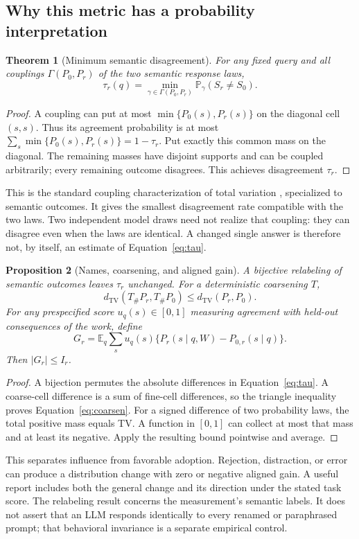 \documentclass[11pt,letterpaper]{article}
\newtheorem{theorem}{Theorem}
\newtheorem{proposition}[theorem]{Proposition}
\theoremstyle{definition}\newtheorem{definition}[theorem]{Definition}
\newcommand{\TV}{d_{\mathrm{TV}}}
\newcommand{\E}{\mathbb{E}}
\newcommand{\Prob}{\mathbb{P}}
\begin{document}
\subsection{Why this metric has a probability interpretation}
\begin{theorem}[Minimum semantic disagreement]
For any fixed query and all couplings $\Gamma(P_0,P_r)$ of the two semantic response laws,
\begin{equation}
\tau_r(q)=\min_{\gamma\in\Gamma(P_0,P_r)}\Prob_\gamma(S_r\ne S_0).
\label{eq:coupling}
\end{equation}
\end{theorem}
\begin{proof}
A coupling can put at most $\min\{P_0(s),P_r(s)\}$ on the diagonal cell $(s,s)$. Thus its agreement probability is at most $\sum_s\min\{P_0(s),P_r(s)\}=1-\tau_r$. Put exactly this common mass on the diagonal. The remaining masses have disjoint supports and can be coupled arbitrarily; every remaining outcome disagrees. This achieves disagreement $\tau_r$.
\end{proof}
This is the standard coupling characterization of total variation \cite{levin2017}, specialized to semantic outcomes. It gives the smallest disagreement rate compatible with the two laws. Two independent model draws need not realize that coupling: they can disagree even when the laws are identical. A changed single answer is therefore not, by itself, an estimate of Equation~\eqref{eq:tau}.

\begin{proposition}[Names, coarsening, and aligned gain]
A bijective relabeling of semantic outcomes leaves $\tau_r$ unchanged. For a deterministic coarsening $T$,
\begin{equation}
\TV(T_\#P_r,T_\#P_0)\le\TV(P_r,P_0).
\label{eq:coarsen}
\end{equation}
For any prespecified score $u_q(s)\in[0,1]$ measuring agreement with held-out consequences of the work, define
\begin{equation}
G_r=\E_q\sum_s u_q(s)\{P_r(s\mid q,W)-P_{0,r}(s\mid q)\}.
\label{eq:gain}
\end{equation}
Then $|G_r|\le I_r$.
\end{proposition}
\begin{proof}
A bijection permutes the absolute differences in Equation~\eqref{eq:tau}. A coarse-cell difference is a sum of fine-cell differences, so the triangle inequality proves Equation~\eqref{eq:coarsen}. For a signed difference of two probability laws, the total positive mass equals TV. A function in $[0,1]$ can collect at most that mass and at least its negative. Apply the resulting bound pointwise and average.
\end{proof}
This separates influence from favorable adoption. Rejection, distraction, or error can produce a distribution change with zero or negative aligned gain. A useful report includes both the general change and its direction under the stated task score.
The relabeling result concerns the measurement's semantic labels. It does not assert that an LLM responds identically to every renamed or paraphrased prompt; that behavioral invariance is a separate empirical control.
\end{document}
